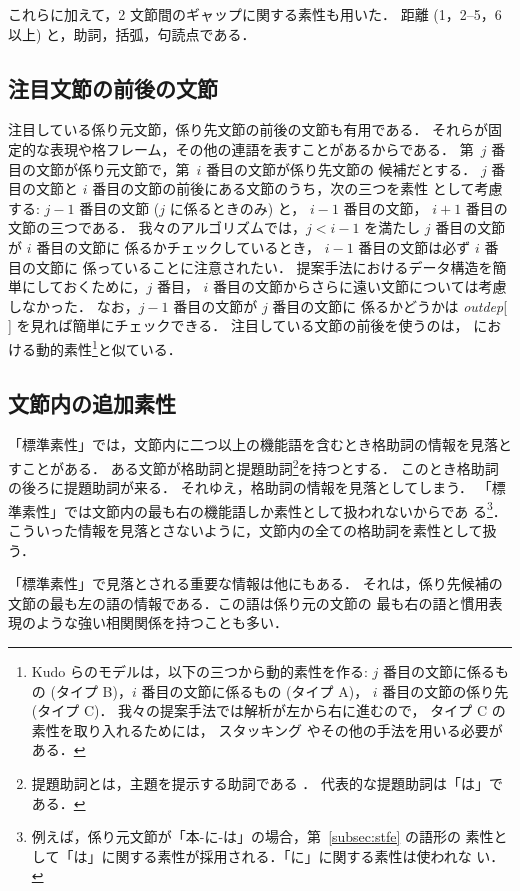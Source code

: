 \documentclass[japanese]{jnlp_1.2c}
\begin{document}
これらに加えて，2 文節間のギャップに関する素性も用いた．
距離 (1，2--5，6以上) と，助詞，括弧，句読点である．

\subsection{注目文節の前後の文節}\label{subsec:loc}
注目している係り元文節，係り先文節の前後の文節も有用である．
それらが固定的な表現や格フレーム，その他の連語を表すことがあるからである．
第~$j$ 番目の文節が係り元文節で，第~$i$ 番目の文節が係り先文節の
候補だとする．
$j$ 番目の文節と $i$ 番目の文節の前後にある文節のうち，次の三つを素性
として考慮する:
$j - 1$ 番目の文節 ($j$ に係るときのみ) と，
$i - 1$ 番目の文節，
$i + 1$ 番目の文節の三つである．
我々のアルゴリズムでは，$j < i - 1$ を満たし $j$ 番目の文節が $i$ 番目の文節に
係るかチェックしているとき，
$i - 1$ 番目の文節は必ず $i$ 番目の文節に
係っていることに注意されたい．
提案手法におけるデータ構造を簡単にしておくために，$j$ 番目，
$i$ 番目の文節からさらに遠い文節については考慮しなかった．
なお，$j - 1$ 番目の文節が $j$ 番目の文節に
係るかどうかは {\it outdep}[ ] を見れば簡単にチェックできる．
注目している文節の前後を使うのは，\cite{Kudo2002} における動的素性\footnote{
Kudo らのモデルは，以下の三つから動的素性を作る:
$j$ 番目の文節に係るもの (タイプ B)，$i$ 番目の文節に係るもの (タイプ A)，
$i$ 番目の文節の係り先 (タイプ C)．
我々の提案手法では解析が左から右に進むので，
タイプ C の素性を取り入れるためには，
スタッキング \cite{Wolpert1992} やその他の手法を用いる必要がある．
}と似ている．


\subsection{文節内の追加素性} 
「標準素性」では，文節内に二つ以上の機能語を含むとき格助詞の情報を見落とすことがある．
ある文節が格助詞と提題助詞\footnote{
提題助詞とは，主題を提示する助詞である \cite[page 50]{Masuoka1992}．
代表的な提題助詞は「は」である．
}を持つとする．
このとき格助詞の後ろに提題助詞が来る．
それゆえ，格助詞の情報を見落としてしまう．
「標準素性」では文節内の最も右の機能語しか素性として扱われないからであ
る\footnote{
例えば，係り元文節が「本-に-は」の場合，第~\ref{subsec:stfe} の語形の
素性として「は」に関する素性が採用される．「に」に関する素性は使われな
い．}．
こういった情報を見落とさないように，文節内の全ての格助詞を素性として扱う．


「標準素性」で見落とされる重要な情報は他にもある．
それは，係り先候補の文節の最も左の語の情報である．この語は係り元の文節の
最も右の語と慣用表現のような強い相関関係を持つことも多い．
\end{document}
